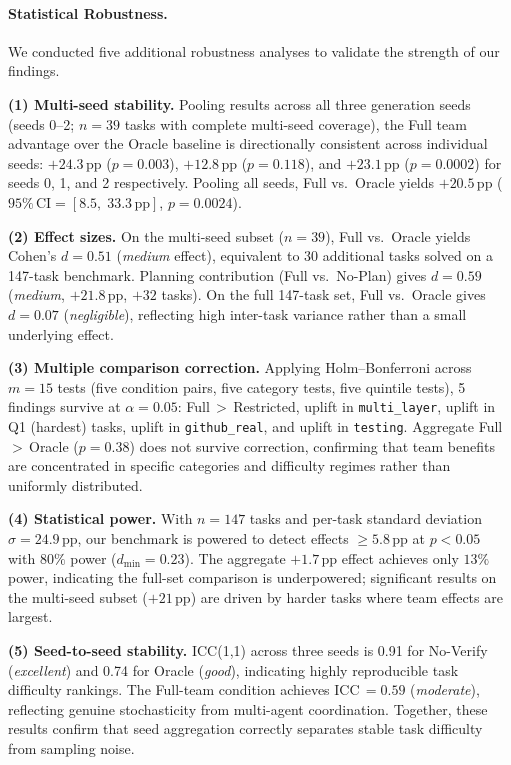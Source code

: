 \paragraph{Statistical Robustness.}
We conducted five additional robustness analyses to validate the strength of our findings.

\textbf{(1) Multi-seed stability.}
Pooling results across all three generation seeds (seeds 0--2; $n=39$ tasks with complete
multi-seed coverage), the Full team advantage over the Oracle baseline is directionally
consistent across individual seeds: $+24.3\,\text{pp}$
($p={0.003}$), $+12.8\,\text{pp}$
($p={0.118}$), and $+23.1\,\text{pp}$
($p={0.0002}$) for seeds 0, 1, and 2 respectively.
Pooling all seeds, Full vs.\ Oracle yields
$+20.5\,\text{pp}$
($95\%\,\text{CI} = [8.5,\;33.3\,\text{pp}]$,
$p={0.0024}$).

\textbf{(2) Effect sizes.}
On the multi-seed subset ($n=39$), Full vs.\ Oracle yields Cohen's $d={0.51}$
(\textit{medium} effect), equivalent to $30$ additional
tasks solved on a 147-task benchmark. Planning contribution (Full vs.\ No-Plan) gives
$d={0.59}$ (\textit{medium}, $+21.8\,\text{pp}$,
$+32$ tasks). On the full 147-task set,
Full vs.\ Oracle gives $d={0.07}$ (\textit{negligible}),
reflecting high inter-task variance rather than a small underlying effect.

\textbf{(3) Multiple comparison correction.}
Applying Holm--Bonferroni across $m=15$ tests
(five condition pairs, five category tests, five quintile tests),
5 findings survive at $\alpha=0.05$: Full\,$>$\,Restricted,
uplift in \texttt{multi\_layer}, uplift in Q1 (hardest) tasks, uplift in \texttt{github\_real},
and uplift in \texttt{testing}. Aggregate Full\,$>$\,Oracle ($p=0.38$) does not survive
correction, confirming that team benefits are concentrated in specific categories and
difficulty regimes rather than uniformly distributed.

\textbf{(4) Statistical power.}
With $n=147$ tasks and per-task standard deviation $\sigma=24.9\,\text{pp}$,
our benchmark is powered to detect effects $\geq 5.8\,\text{pp}$ at
$p<0.05$ with $80\%$ power ($d_{\min}=0.23$). The aggregate
$+1.7\,\text{pp}$ effect achieves only $13\%$ power, indicating the
full-set comparison is underpowered; significant results on the multi-seed subset
($+21\,\text{pp}$) are driven by harder tasks
where team effects are largest.

\textbf{(5) Seed-to-seed stability.}
ICC(1,1) across three seeds is 0.91 for No-Verify (\textit{excellent})
and 0.74 for Oracle (\textit{good}),
indicating highly reproducible task difficulty rankings. The Full-team condition
achieves ICC\,$=0.59$ (\textit{moderate}), reflecting genuine
stochasticity from multi-agent coordination. Together, these results confirm that
seed aggregation correctly separates stable task difficulty from sampling noise.